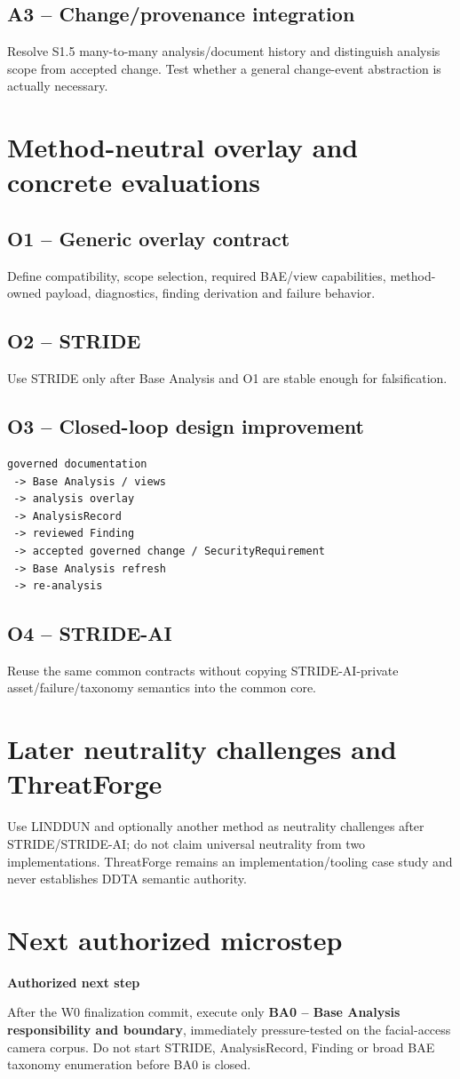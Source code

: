 \documentclass[11pt,a4paper]{article}
\newenvironment{gate}[1]{\def\FrameCommand{\fcolorbox{ddtagreen}{ddtagray}}\MakeFramed{\advance\hsize-2\width\FrameRestore}\noindent\textbf{#1}\par\smallskip}{\endMakeFramed}
\begin{document}
\subsection{A3 -- Change/provenance integration}Resolve S1.5 many-to-many analysis/document history and distinguish analysis scope from accepted change. Test whether a general change-event abstraction is actually necessary.

\section{Method-neutral overlay and concrete evaluations}
\subsection{O1 -- Generic overlay contract}Define compatibility, scope selection, required BAE/view capabilities, method-owned payload, diagnostics, finding derivation and failure behavior.
\subsection{O2 -- STRIDE}Use STRIDE only after Base Analysis and O1 are stable enough for falsification.
\subsection{O3 -- Closed-loop design improvement}
\begin{lstlisting}
governed documentation
 -> Base Analysis / views
 -> analysis overlay
 -> AnalysisRecord
 -> reviewed Finding
 -> accepted governed change / SecurityRequirement
 -> Base Analysis refresh
 -> re-analysis
\end{lstlisting}
\subsection{O4 -- STRIDE-AI}Reuse the same common contracts without copying STRIDE-AI-private asset/failure/taxonomy semantics into the common core.

\section{Later neutrality challenges and ThreatForge}
Use LINDDUN and optionally another method as neutrality challenges after STRIDE/STRIDE-AI; do not claim universal neutrality from two implementations. ThreatForge remains an implementation/tooling case study and never establishes DDTA semantic authority.

\section{Next authorized microstep}
\begin{gate}{Authorized next step}
After the W0 finalization commit, execute only \textbf{BA0 -- Base Analysis responsibility and boundary}, immediately pressure-tested on the facial-access camera corpus. Do not start STRIDE, AnalysisRecord, Finding or broad BAE taxonomy enumeration before BA0 is closed.
\end{gate}
\end{document}
